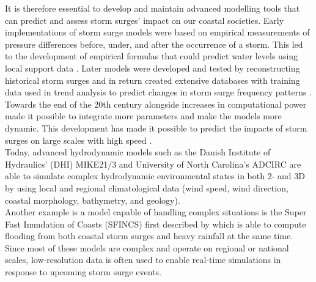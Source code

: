 It is therefore essential to develop and maintain advanced modelling tools that can predict and assess storm surges' impact on our coastal societies. Early implementations of storm surge models were based on empirical measurements of pressure differences before, under, and after the occurrence of a storm. This led to the development of empirical formulas that could predict water levels using local support data \citep{massey_history_2007}. Later models were developed and tested by reconstructing historical storm surges and in return created extensive databases with training data used in trend analysis to predict changes in storm surge frequency patterns \citep{dang_dataset_2024, tadesse_database_2021}.\\
Towards the end of the 20th century alongside increases in computational power made it possible to integrate more parameters and make the models more dynamic. This development has made it possible to predict the impacts of storm surges on large scales with high speed \citep{tadesse_database_2021, massey_history_2007}.\\
Today, advanced hydrodynamic models such as the Danish Institute of Hydraulics' (DHI) MIKE21/3 \citep{dhi_mike_2024} and University of North Carolina's ADCIRC are able to simulate complex hydrodynamic environmental states in both 2- and 3D by using local and regional climatological data (wind speed, wind direction, coastal morphology, bathymetry, and geology).\\
Another example is a model capable of handling complex situations is the Super Fast Inundation of Coasts (SFINCS) first described by \cite{leijnse_modeling_2021} which is able to compute flooding from both coastal storm surges and heavy rainfall at the same time.\\
Since most of these models are complex and operate on regional or national scales, low-resolution data is often used to enable real-time simulations in response to upcoming storm surge events. \\

